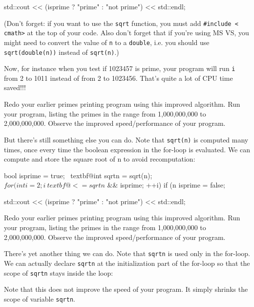 \begin{console}
\begin{console}
\begin{console}[commandchars=\~\@\$]
std::cout << (isprime ? "prime" : "not prime")
          << std::endl;
\end{console}
(Don't forget: if you want to use the \texttt{sqrt} function, you must add \texttt{\#include < cmath>} at the top of your code. Also don't forget that if you're using MS VS, you might need to convert the value of \texttt{n} to a \texttt{double}, i.e. you should use \texttt{sqrt(double(n))} instead of \texttt{sqrt(n)}.)

Now, for instance when you test if 1023457 is prime, your program will
run \texttt{i} from 2 to 1011 instead of from 2 to 1023456.
That's quite a lot of CPU time saved!!!

\begin{ex}
Redo your earlier primes printing program using this
improved algorithm. Run your program, listing the primes in the range
from 1,000,000,000 to 2,000,000,000. Observe the improved
speed/performance of your program.
\end{ex}
But there's still something else you can do. Note that
\texttt{sqrt(n)} is computed many times, once every time the boolean
expression in the for-loop is evaluated. We can compute and store the
square root of n to avoid recomputation:
\begin{console}[commandchars=\~\@\$]
bool isprime = true;
~textbf@int sqrtn = sqrt(n);$
for (int i = 2; i ~textbf@<= sqrtn$ && isprime; ++i)
{   
    if (n %
    {
        isprime = false;
    }
}

std::cout << (isprime ? "prime" : "not prime")
          << std::endl;
\end{console}
\begin{ex}
Redo your earlier primes printing program using this
improved algorithm. Run your program, listing the primes in the range
from 1,000,000,000 to 2,000,000,000. Observe the improved
speed/performance of your program.
\end{ex}
There's yet another thing we can do. Note that \texttt{sqrtn} is used only in the for-loop. We can actually declare \texttt{sqrtn} at the initialization part of the for-loop so that the scope of \texttt{sqrtn} stays inside the loop:
Note that this does not improve the speed of your program. It simply
shrinks the scope of variable \texttt{sqrtn}.


\end{console}
\end{console}
